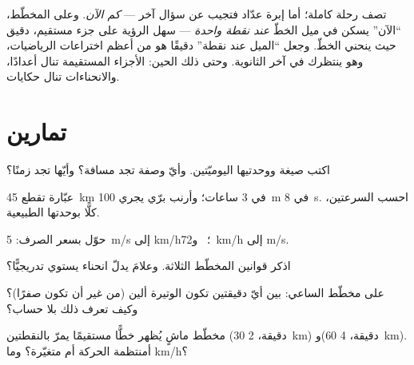 \begin{remark}\label{rem:g7:motion-average-speed:speedometer}
 تصف رحلة كاملة؛ أما إبرة عدّاد  فتجيب عن
سؤال آخر --- \emph{كم  الآن}. وعلى المخطّط، ``الآن'' يسكن
في ميل الخطّ \emph{عند نقطة واحدة} --- سهل الرؤية على جزء
مستقيم، دقيق حيث ينحني الخطّ. وجعل ``الميل عند نقطة'' دقيقًا هو
من أعظم اختراعات الرياضيات، وهو ينتظرك في آخر الثانوية. وحتى
ذلك الحين: الأجزاء المستقيمة تنال أعدادًا، والانحناءات تنال
حكايات.
\end{remark}

\section{تمارين}

\begin{exercise}[$\star$]\label{exo:g7:motion-average-speed:1}
اكتب صيغة  ووحدتيها اليوميّتين. وأيّ وصفة تجد مسافة؟
وأيّها تجد زمنًا؟
\end{exercise}

\begin{exercise}[$\star$]\label{exo:g7:motion-average-speed:2}
عبّارة تقطع \qty{45}{km} في $3$ ساعات؛ وأرنب برّي يجري
\qty{100}{m} في \qty{8}{s}. احسب السرعتين، كلًّا بوحدتها
الطبيعية.
\end{exercise}

\begin{exercise}[$\star$]\label{exo:g7:motion-average-speed:3}
حوّل بسعر الصرف: \qty{5}{m/s} إلى \unit{km/h}؛ \
و\qty{72}{km/h} إلى \unit{m/s}.
\end{exercise}

\begin{exercise}[$\star$]\label{exo:g7:motion-average-speed:4}
اذكر قوانين المخطّط الثلاثة. وعلامَ يدلّ انحناء يستوي
تدريجيًّا؟
\end{exercise}

\begin{exercise}[$\star$]\label{exo:g7:motion-average-speed:5}
على مخطّط الساعي: بين أيّ دقيقتين تكون الوتيرة ألين (من غير أن
تكون صفرًا)؟ وكيف تعرف ذلك بلا حساب؟
\end{exercise}

\begin{exercise}[$\star$]\label{exo:g7:motion-average-speed:6}
مخطّط ماشٍ يُظهر خطًّا مستقيمًا يمرّ بالنقطتين ($30$ دقيقة،
\qty{2}{km}) و($60$ دقيقة، \qty{4}{km}). أمنتظمة الحركة أم
متغيّرة؟ وما   \unit{km/h}؟
\end{exercise}

